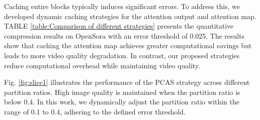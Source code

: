  Caching entire blocks typically induces significant errors. To address this, we developed dynamic caching strategies for the attention output and attention map. TABLE \ref{table:Comparison of different strategies} presents the quantitative compression results on OpenSora with an error threshold of 0.025. The results show that caching the attention map achieves greater computational savings but leads to more video quality degradation. In contrast, our proposed strategies reduce computational overhead while maintaining video quality.


 Fig. \ref{fig:slice1} illustrates the performance of the PCAS strategy across different partition ratios. High image quality is maintained when the partition ratio is below 0.4. In this work, we dynamically adjust the partition ratio within the range of 0.1 to 0.4, adhering to the defined error threshold.


